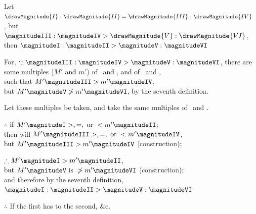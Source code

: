 \documentclass[booklanguage=english]{byrnebook}
\begin{document}
\begin{center}
Let $\drawMagnitude{I} : \drawMagnitude{II} = \drawMagnitude{III} : \drawMagnitude{IV}$, but $\magnitudeIII : \magnitudeIV > \drawMagnitude{V} : \drawMagnitude{VI}$,\\
then $\magnitudeI : \magnitudeII > \magnitudeV : \magnitudeVI$

For, $\because \magnitudeIII : \magnitudeIV > \magnitudeV : \magnitudeVI$, there are some multiples ($M'$ and $m'$) of \magnitudeIII\ and \magnitudeV, and of \magnitudeIV\ and \magnitudeVI,\\ %
such that $M' \magnitudeIII > m' \magnitudeIV$,\\
but $M' \magnitudeV \ngtr m' \magnitudeVI$, by the seventh definition. %

Let these multiples be taken, and take the same multiples of \magnitudeI\ and \magnitudeII.

$\therefore$  if $M' \magnitudeI >, =, \mbox{ or } < m' \magnitudeII$;\\
then will $M' \magnitudeIII >, =, \mbox{ or } < m' \magnitudeIV$,\\
but $M' \magnitudeIII > m' \magnitudeIV$ (construction);

$\therefore M' \magnitudeI > m' \magnitudeII$,\\
but $M' \magnitudeV \mbox{ is } \ngtr m' \magnitudeVI$ (construction);\\ %
and therefore by the seventh definition,\\
$\magnitudeI : \magnitudeII > \magnitudeV : \magnitudeVI$

$\therefore$ If the first has to the second, \&c.
\end{center}

\vfill\pagebreak

\label{prop:V.XIV}
\end{document}
